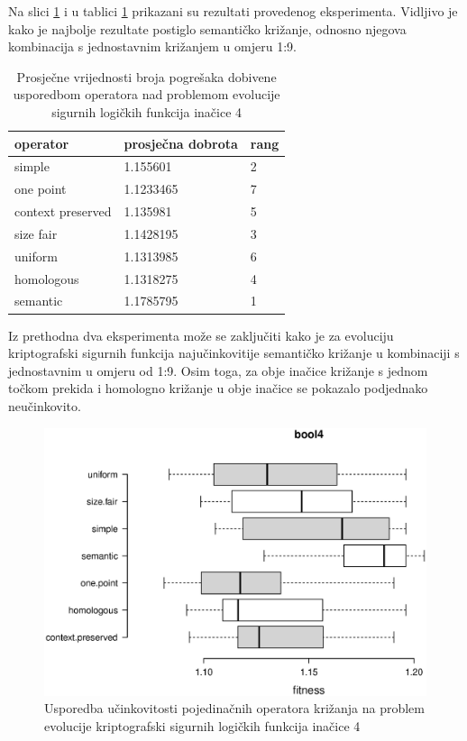 Na slici \ref{bool4box} i u tablici \ref{bool4table} prikazani su rezultati provedenog eksperimenta. Vidljivo je kako je najbolje rezultate postiglo semantičko križanje, odnosno njegova kombinacija s jednostavnim križanjem u omjeru 1:9.

\begin{table}[H]
 	\centering

    \begin{tabular}{| l | l | l |}
    \hline
    \textbf{operator} & \textbf{prosječna dobrota} & \textbf{rang}\\ \hline
    simple & 1.155601 & 2\\ \hline
    one point & 1.1233465 & 7\\ \hline
    context preserved & 1.135981 & 5\\ \hline
    size fair & 1.1428195 & 3\\ \hline
    uniform & 1.1313985 & 6\\ \hline
    homologous & 1.1318275 & 4\\ \hline
    semantic & 1.1785795 & 1\\ \hline
    \end{tabular}
    
    \caption{Prosječne vrijednosti broja pogrešaka dobivene usporedbom operatora nad problemom evolucije sigurnih logičkih funkcija inačice 4}
    \label{bool4table}
\end{table}


Iz prethodna dva eksperimenta može se zaključiti kako je za evoluciju kriptografski sigurnih funkcija najučinkovitije semantičko križanje u kombinaciji s jednostavnim u omjeru od 1:9. Osim toga, za obje inačice križanje s jednom točkom prekida i homologno križanje u obje inačice se pokazalo podjednako neučinkovito.

\begin{figure}[H]
	\centering
	\includegraphics[trim=0cm 4cm 0cm 0cm, scale=0.6]{./slike/boxPlots/bool4.eps}
	\caption{Usporedba učinkovitosti pojedinačnih operatora križanja na problem evolucije kriptografski sigurnih logičkih funkcija inačice 4}
	\label{bool4box}
\end{figure}


